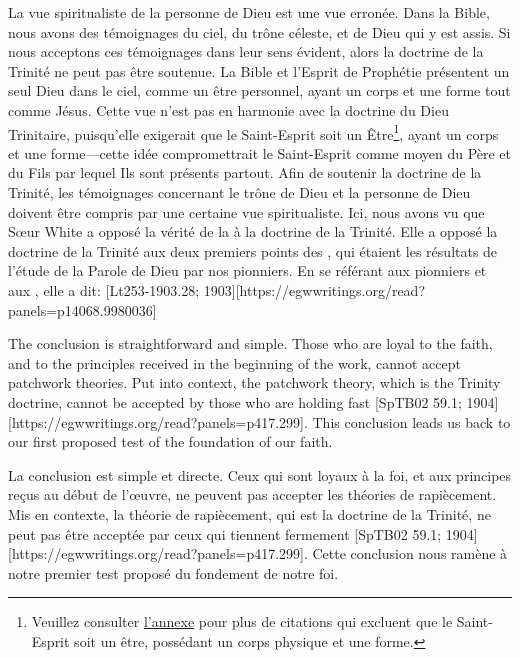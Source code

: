 La vue spiritualiste de la personne de Dieu est une vue erronée. Dans la Bible, nous avons des témoignages du ciel, du trône céleste, et de Dieu qui y est assis. Si nous acceptons ces témoignages dans leur sens évident, alors la doctrine de la Trinité ne peut pas être soutenue. La Bible et l'Esprit de Prophétie présentent un seul Dieu dans le ciel, comme un être personnel, ayant un corps et une forme tout comme Jésus. Cette vue n'est pas en harmonie avec la doctrine du Dieu Trinitaire, puisqu'elle exigerait que le Saint-Esprit soit un Être\footnote{Veuillez consulter \hyperref[appendix:unauthenticated-reports]{l'annexe} pour plus de citations qui excluent que le Saint-Esprit soit un être, possédant un corps physique et une forme.}, ayant un corps et une forme—cette idée compromettrait le Saint-Esprit comme moyen du Père et du Fils par lequel Ils sont présents partout. Afin de soutenir la doctrine de la Trinité, les témoignages concernant le trône de Dieu et la personne de Dieu doivent être compris par une certaine vue spiritualiste. Ici, nous avons vu que Sœur White a opposé la vérité de la  à la doctrine de la Trinité. Elle a opposé la doctrine de la Trinité aux deux premiers points des , qui étaient les résultats de l'étude de la Parole de Dieu par nos pionniers. En se référant aux pionniers et aux , elle a dit: [Lt253-1903.28; 1903][https://egwwritings.org/read?panels=p14068.9980036]


The conclusion is straightforward and simple. Those who are loyal to the faith, and to the principles received in the beginning of the work, cannot accept patchwork theories. Put into context, the patchwork theory, which is the Trinity doctrine, cannot be accepted by those who are holding fast [SpTB02 59.1; 1904][https://egwwritings.org/read?panels=p417.299]. This conclusion leads us back to our first proposed test of the foundation of our faith.


La conclusion est simple et directe. Ceux qui sont loyaux à la foi, et aux principes reçus au début de l'œuvre, ne peuvent pas accepter les théories de rapiècement. Mis en contexte, la théorie de rapiècement, qui est la doctrine de la Trinité, ne peut pas être acceptée par ceux qui tiennent fermement [SpTB02 59.1; 1904][https://egwwritings.org/read?panels=p417.299]. Cette conclusion nous ramène à notre premier test proposé du fondement de notre foi.


